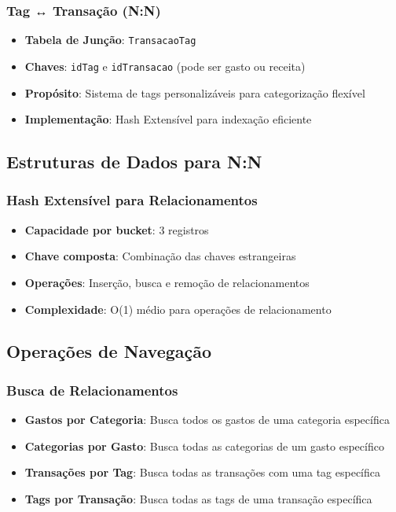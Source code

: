 \documentclass[12pt,a4paper]{article}
\begin{document}
\subsubsection*{Tag ↔ Transação (N:N)}
\begin{itemize}
  \item \textbf{Tabela de Junção}: \texttt{TransacaoTag}
  \item \textbf{Chaves}: \texttt{idTag} e \texttt{idTransacao} (pode ser gasto ou receita)
  \item \textbf{Propósito}: Sistema de tags personalizáveis para categorização flexível
  \item \textbf{Implementação}: Hash Extensível para indexação eficiente
\end{itemize}

\subsection{Estruturas de Dados para N:N}

\subsubsection*{Hash Extensível para Relacionamentos}
\begin{itemize}
  \item \textbf{Capacidade por bucket}: 3 registros
  \item \textbf{Chave composta}: Combinação das chaves estrangeiras
  \item \textbf{Operações}: Inserção, busca e remoção de relacionamentos
  \item \textbf{Complexidade}: O(1) médio para operações de relacionamento
\end{itemize}

\subsection{Operações de Navegação}

\subsubsection*{Busca de Relacionamentos}
\begin{itemize}
  \item \textbf{Gastos por Categoria}: Busca todos os gastos de uma categoria específica
  \item \textbf{Categorias por Gasto}: Busca todas as categorias de um gasto específico
  \item \textbf{Transações por Tag}: Busca todas as transações com uma tag específica
  \item \textbf{Tags por Transação}: Busca todas as tags de uma transação específica
\end{itemize}
\end{document}
